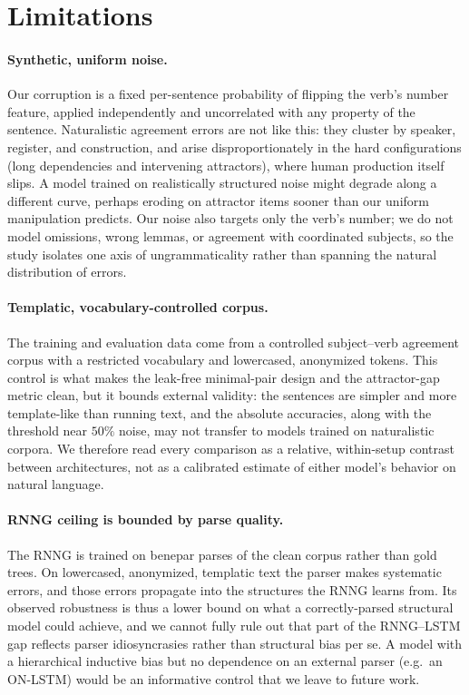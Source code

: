 \section*{Limitations}
\label{sec:limitations}

\paragraph{Synthetic, uniform noise.}
Our corruption is a fixed per-sentence probability of flipping the verb's number
feature, applied independently and uncorrelated with any property of the
sentence. Naturalistic agreement errors are not like this: they cluster by
speaker, register, and construction, and arise disproportionately in the hard
configurations (long dependencies and intervening attractors), where human
production itself slips. A model trained on realistically structured noise might
degrade along a different curve, perhaps eroding on attractor items sooner than
our uniform manipulation predicts. Our noise also targets only the verb's number;
we do not model omissions, wrong lemmas, or agreement with coordinated subjects,
so the study isolates one axis of ungrammaticality rather than spanning the
natural distribution of errors.

\paragraph{Templatic, vocabulary-controlled corpus.}
The training and evaluation data come from a controlled subject--verb agreement
corpus with a restricted vocabulary and lowercased, anonymized tokens. This
control is what makes the leak-free minimal-pair design and the attractor-gap
metric clean, but it bounds external validity: the sentences are simpler and more
template-like than running text, and the absolute accuracies, along with the
threshold near $50\%$ noise, may not transfer to models trained on naturalistic
corpora. We therefore read every comparison as a relative, within-setup contrast
between architectures, not as a calibrated estimate of either model's behavior on
natural language.

\paragraph{RNNG ceiling is bounded by parse quality.}
The RNNG is trained on benepar parses of the clean corpus rather than gold trees.
On lowercased, anonymized, templatic text the parser makes systematic errors,
and those errors propagate into the structures the RNNG learns from. Its observed
robustness is thus a lower bound on what a correctly-parsed structural model could
achieve, and we cannot fully rule out that part of the RNNG--LSTM gap reflects
parser idiosyncrasies rather than structural bias per se. A model with a
hierarchical inductive bias but no dependence on an external parser (e.g.\ an
ON-LSTM) would be an informative control that we leave to future work.

